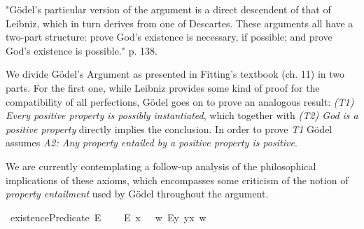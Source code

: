 %
\begin{isabellebody}%
%
%
\isadelimtheory
%
\endisadelimtheory
%
\isatagtheory
%
\endisatagtheory
{\isafoldtheory}%
%
\isadelimtheory
%
\endisadelimtheory
%
\isamarkuptrue%
%
\begin{isamarkuptext}%
"G\"odel's particular version of the argument is a direct descendent of that of Leibniz, which in turn derives
  from one of Descartes. These arguments all have a two-part structure: prove God's existence is necessary,
  if possible; and prove God's existence is possible." \cite{Fitting} p. 138.%
\end{isamarkuptext}\isamarkuptrue%
%
\isamarkuptrue%
%
\begin{isamarkuptext}%
We divide G\"odel's Argument as presented in Fitting's textbook (ch. 11) in two parts. For the first one, while Leibniz provides
  some kind of proof for the compatibility of all perfections, G\"odel goes on to prove an analogous result:
 \emph{(T1) Every positive property is possibly instantiated}, which together with \emph{(T2) God is a positive property}
  directly implies the conclusion. In order to prove \emph{T1} G\"odel assumes \emph{A2: Any property entailed by a positive property is positive}.%
\end{isamarkuptext}\isamarkuptrue%
%
\begin{isamarkuptext}%
We are currently contemplating a follow-up analysis of the philosophical implications of these axioms,
 which encompasses some criticism of the notion of \emph{property entailment} used by G\"odel throughout the argument.%
\end{isamarkuptext}\isamarkuptrue%
%
\isamarkuptrue%
\isamarkupfalse%
\ existencePredicate{\isacharcolon}{\isacharcolon}{\isachardoublequoteopen}{\isasymup}{\isasymlangle}{\isasymzero}{\isasymrangle}{\isachardoublequoteclose}\ {\isacharparenleft}{\isachardoublequoteopen}E{\isacharbang}{\isachardoublequoteclose}{\isacharparenright}\ \isanewline
\ \ \ {\isachardoublequoteopen}E{\isacharbang}\ x\ \ {\isasymequiv}\ {\isasymlambda}w{\isachardot}\ {\isacharparenleft}\isactrlbold {\isasymexists}\isactrlsup Ey{\isachardot}\ y\isactrlbold {\isasymapprox}x{\isacharparenright}\ w{\isachardoublequoteclose}\ %
\isanewline
{}\isamarkupfalse%

\end{isabellebody}
